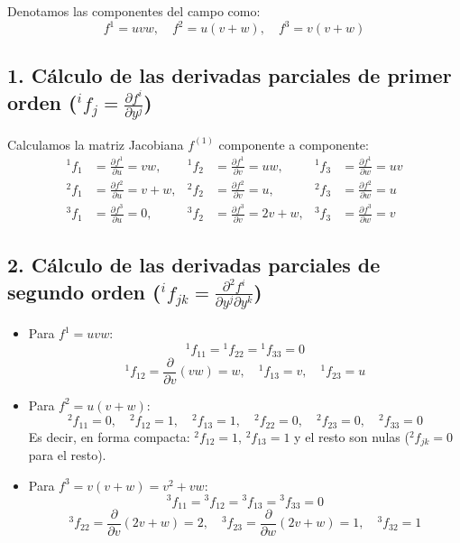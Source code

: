 Denotamos las componentes del campo como:
$$ f^1 = uvw, \quad f^2 = u(v+w), \quad f^3 = v(v+w) $$

\subsection*{1. Cálculo de las derivadas parciales de primer orden ($^i f_j = \frac{\partial f^i}{\partial y^j}$)}

Calculamos la matriz Jacobiana $f^{(1)}$ componente a componente:
\begin{align*}
    {^1}f_1 &= \frac{\partial f^1}{\partial u} = vw, & {^1}f_2 &= \frac{\partial f^1}{\partial v} = uw, & {^1}f_3 &= \frac{\partial f^1}{\partial w} = uv \\
    {^2}f_1 &= \frac{\partial f^2}{\partial u} = v + w, & {^2}f_2 &= \frac{\partial f^2}{\partial v} = u, & {^2}f_3 &= \frac{\partial f^2}{\partial w} = u \\
    {^3}f_1 &= \frac{\partial f^3}{\partial u} = 0, & {^3}f_2 &= \frac{\partial f^3}{\partial v} = 2v + w, & {^3}f_3 &= \frac{\partial f^3}{\partial w} = v
\end{align*}

\subsection*{2. Cálculo de las derivadas parciales de segundo orden (${^i}f_{jk} = \frac{\partial^2 f^i}{\partial y^j \partial y^k}$)}

\begin{itemize}
    \item Para $f^1 = uvw$:
    $$ {^1}f_{11} = {^1}f_{22} = {^1}f_{33} = 0 $$
    $$ {^1}f_{12} = \frac{\partial}{\partial v}(vw) = w, \quad {^1}f_{13} = v, \quad {^1}f_{23} = u $$

    \item Para $f^2 = u(v+w)$:
    $$ {^2}f_{11} = 0, \quad {^2}f_{12} = 1, \quad {^2}f_{13} = 1, \quad {^2}f_{22} = 0, \quad {^2}f_{23} = 0, \quad {^2}f_{33} = 0 $$
    Es decir, en forma compacta: ${^2}f_{12} = 1, \, {^2}f_{13} = 1$ y el resto son nulas (${^2}f_{jk} = 0$ para el resto).

    \item Para $f^3 = v(v+w) = v^2 + vw$:
    $$ {^3}f_{11} = {^3}f_{12} = {^3}f_{13} = {^3}f_{33} = 0 $$
    $$ {^3}f_{22} = \frac{\partial}{\partial v}(2v + w) = 2, \quad {^3}f_{23} = \frac{\partial}{\partial w}(2v + w) = 1, \quad {^3}f_{32} = 1 $$
\end{itemize}

